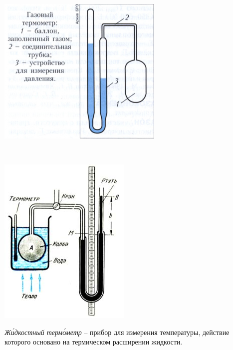 \begin{minipage}{0.45\textwidth} 
\includegraphics[width=\linewidth]{1.png}\\
\end{minipage}
\begin{minipage}{0.07\textwidth}
\
\end{minipage}
\begin{minipage}{0.45\textwidth}
\includegraphics[width=0.7\linewidth]{2.jpg}\\
\end{minipage}
\newpage
\textit{Жи́дкостный термо́метр} -- прибор для измерения температуры, действие которого основано на термическом расширении жидкости.\\

